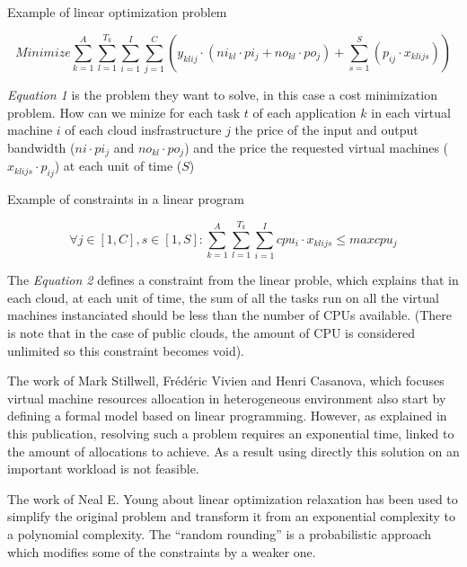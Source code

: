 \documentclass[a4paper,11pt]{article}
\begin{document}
\begin{figequation}
	\caption{Example of linear optimization problem}
	\[
		Minimize
		\sum_{k=1}^A \sum_{l=1}^{T_k} \sum_{i=1}^I \sum_{j=1}^C ( y_{klij} \cdot (ni_{kl} \cdot {pi_j} + no_{kl} \cdot po_j) + \sum_{s=1}^S ( p_{ij} \cdot x_{klijs} ))
	\]
\end{figequation}

\textit{Equation 1} is the problem they want to solve, in this case a cost
minimization problem. How can we minize for each task $t$ of each application
$k$ in each virtual machine $i$ of each cloud insfrastructure $j$ the price of
the input and output bandwidth ($ni \cdot pi_j$ and $no_{kl} \cdot po_j$) and
the price the requested virtual machines ($x_{klijs} \cdot p_{ij}$) at each
unit of time ($S$)

\begin{figequation}
	\caption{Example of constraints in a linear program}
	\[
		\forall j \in [1,C], s \in [1,S]:
		\sum_{k=1}^{A} \sum_{l=1}^{T_k} \sum_{i=1}^{I} cpu_i \cdot x_{klijs} \leq maxcpu_j
	\]
\end{figequation}

The \textit{Equation 2} defines a constraint from the linear proble, which
explains that in each cloud, at each unit of time, the sum of all the tasks run
on all the virtual machines instanciated should be less than the number of CPUs
available.  (There is note that in the case of public clouds, the amount of CPU
is considered unlimited so this constraint becomes void).

\vspace{1em}

The work of Mark Stillwell, Frédéric Vivien and Henri Casanova, which
focuses virtual machine resources allocation in heterogeneous
environment \cite{allocation:heterogeneous} also start by defining a formal
model based on linear programming. However, as explained in this publication,
resolving such a problem requires an exponential time, linked to the amount of
allocations to achieve. As a result using directly this solution on an
important workload is not feasible.

\vspace{1em}

The work of Neal E. Young about linear optimization
relaxation\cite{maths:rrndlp} has been used to simplify the original problem
and transform it from an exponential complexity to a polynomial complexity. The
“random rounding” is a probabilistic approach which modifies some of the
constraints by a weaker one.
\end{document}

